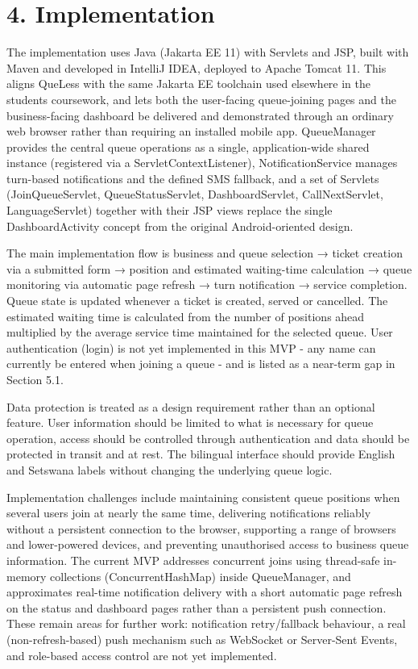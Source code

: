 \documentclass[
]{article}
\begin{document}
\section{4. Implementation}\label{implementation}

The implementation uses Java (Jakarta EE 11) with Servlets and JSP,
built with Maven and developed in IntelliJ IDEA, deployed to Apache
Tomcat 11. This aligns QueLess with the same Jakarta EE toolchain used
elsewhere in the student\textquotesingle s coursework, and lets both the
user-facing queue-joining pages and the business-facing dashboard be
delivered and demonstrated through an ordinary web browser rather than
requiring an installed mobile app. QueueManager provides the central
queue operations as a single, application-wide shared instance
(registered via a ServletContextListener), NotificationService manages
turn-based notifications and the defined SMS fallback, and a set of
Servlets (JoinQueueServlet, QueueStatusServlet, DashboardServlet,
CallNextServlet, LanguageServlet) together with their JSP views replace
the single DashboardActivity concept from the original Android-oriented
design.

The main implementation flow is business and queue selection → ticket
creation via a submitted form → position and estimated waiting-time
calculation → queue monitoring via automatic page refresh → turn
notification → service completion. Queue state is updated whenever a
ticket is created, served or cancelled. The estimated waiting time is
calculated from the number of positions ahead multiplied by the average
service time maintained for the selected queue. User authentication
(login) is not yet implemented in this MVP - any name can currently be
entered when joining a queue - and is listed as a near-term gap in
Section 5.1.

Data protection is treated as a design requirement rather than an
optional feature. User information should be limited to what is
necessary for queue operation, access should be controlled through
authentication and data should be protected in transit and at rest. The
bilingual interface should provide English and Setswana labels without
changing the underlying queue logic.

Implementation challenges include maintaining consistent queue positions
when several users join at nearly the same time, delivering
notifications reliably without a persistent connection to the browser,
supporting a range of browsers and lower-powered devices, and preventing
unauthorised access to business queue information. The current MVP
addresses concurrent joins using thread-safe in-memory collections
(ConcurrentHashMap) inside QueueManager, and approximates real-time
notification delivery with a short automatic page refresh on the status
and dashboard pages rather than a persistent push connection. These
remain areas for further work: notification retry/fallback behaviour, a
real (non-refresh-based) push mechanism such as WebSocket or Server-Sent
Events, and role-based access control are not yet implemented.
\end{document}
